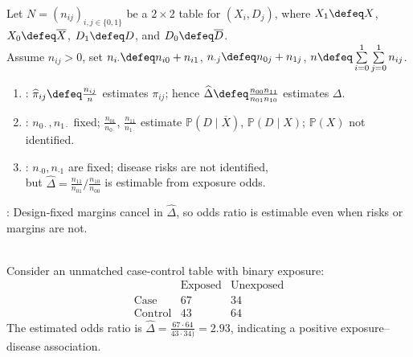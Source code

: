 \begin{method} \label{meth:odds-ratio-by-sampling-design} \\
Let $N=(n_{ij})_{i,j\in\{0,1\}}$ be a $2\times2$ table for $(X_i,D_j)$, where $X_1\defeq X$, $X_0\defeq\overline{X}$, $D_1\defeq D$, and $D_0\defeq\overline{D}$.\\
Assume $n_{ij}>0$, set $n_{i\cdot}\defeq n_{i0}+n_{i1}$, $n_{\cdot j}\defeq n_{0j}+n_{1j}$, $n\defeq\sum\limits_{i=0}^{1}\sum\limits_{j=0}^{1}n_{ij}$.
\begin{enumerate}[label=(\roman*)]
\setlength{\itemsep}{0pt}
\item {}: $\widehat{\pi}_{ij}\defeq\frac{n_{ij}}{n}$ estimates $\pi_{ij}$; hence $\widehat{\Delta}\defeq\frac{n_{00}n_{11}}{n_{01}n_{10}}$ estimates $\Delta$.
\item {}: $n_{0\cdot},n_{1\cdot}$ fixed; $\frac{n_{01}}{n_{0\cdot}}$, $\frac{n_{11}}{n_{1\cdot}}$ estimate $\mathbb{P}(D\mid\overline{X})$, $\mathbb{P}(D\mid X)$; $\mathbb{P}(X)$ not identified.
\item {}: $n_{\cdot0},n_{\cdot1}$ are fixed; disease risks are not identified,\\
but $\widehat{\Delta}=\frac{n_{11}}{n_{01}}/\frac{n_{10}}{n_{00}}$ is estimable from exposure odds.
\end{enumerate}
: Design-fixed margins cancel in $\widehat{\Delta}$, so odds ratio is estimable even when risks or margins are not.
\end{method}

\begin{example} \label{ex:unmatched-case-control-odds-ratio} \\
Consider an unmatched case-control table with binary exposure:
\[
\begin{array}{c|cc}
&\text{Exposed}&\text{Unexposed}\\ \hline
\text{Case}&67&34\\
\text{Control}&43&64
\end{array}
\]
The estimated odds ratio is $\widehat{\Delta}=\frac{67\cdot64}{43\cdot34)}=2.93$, indicating a positive exposure--disease association.
\end{example}

